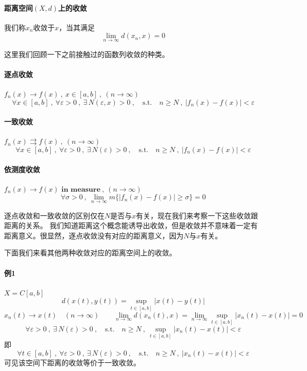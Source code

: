 \paragraph*{距离空间$(X,d)$上的收敛} \quad 我们称$x_n$收敛于$x$，当其满足
\[\lim_{n \rightarrow \infty}d(x_n,x)=0\]

这里我们回顾一下之前接触过的函数列收敛的种类。

\paragraph*{逐点收敛} \quad $f_n(x) \rightarrow f(x) \ , \ x \in [a,b] \ , \ (n \rightarrow \infty)$
\[\forall x \in [a,b] \ , \ \forall \varepsilon>0 \ , \ \exists \, N(\varepsilon,x)>0 \ , \quad \text{s.t.} \quad n \geq N \ , \ |f_n(x)-f(x)|<\varepsilon\]

\paragraph*{一致收敛} \quad $f_n(x) \rightrightarrows f(x) \ , \ (n \rightarrow \infty)$
\[\forall x \in [a,b] \ , \ \forall \varepsilon>0 \ , \ \exists \, N(\varepsilon)>0 \ , \quad \text{s.t.} \quad n \geq N \ , \ |f_n(x)-f(x)|<\varepsilon\]

\paragraph*{依测度收敛} \quad $f_n(x) \rightarrow f(x)\textbf{ in measure} \ , \ (n \rightarrow \infty)$
\[\forall \sigma>0 \ , \ \lim_{n \rightarrow \infty}m\{|f_n(x)-f(x)| \geq \sigma\}=0\]

逐点收敛和一致收敛的区别仅在$N$是否与$x$有关，现在我们来考察一下这些收敛跟距离的关系。
我们知道距离这个概念能诱导出收敛，但是收敛并不意味着一定有距离意义。很显然，逐点收敛没有对应的距离意义，因为$N$与$x$有关。

下面我们来看其他两种收敛对应的距离空间上的收敛。

\paragraph*{例1} \quad $X=C[a,b]$
\[d(x(t),y(t))=\mathop {\text{sup}}\limits_{t \in [a,b]}|x(t)-y(t)|\]
\[x_n(t) \rightarrow x(t) \quad (n \rightarrow \infty) \qquad \lim_{n \rightarrow \infty}d(x_n(t),x)=\lim_{n \rightarrow \infty}\mathop {\text{sup}}\limits_{t \in [a,b]}|x_n(t)-x(t)|=0\]
\[\forall \varepsilon>0 \ , \ \exists \, N(\varepsilon)>0 \ , \quad \text{s.t.} \quad n \geq N \ , \ \mathop {\text{sup}}\limits_{t \in [a,b]}|x_n(t)-x(t)|<\varepsilon\]
即
\[\forall t \in [a,b] \ , \ \forall \varepsilon>0 \ , \ \exists \, N(\varepsilon)>0 \ , \quad \text{s.t.} \quad n \geq N \ , \ |x_n(t)-x(t)|<\varepsilon\]
可见该空间下距离的收敛等价于一致收敛。

